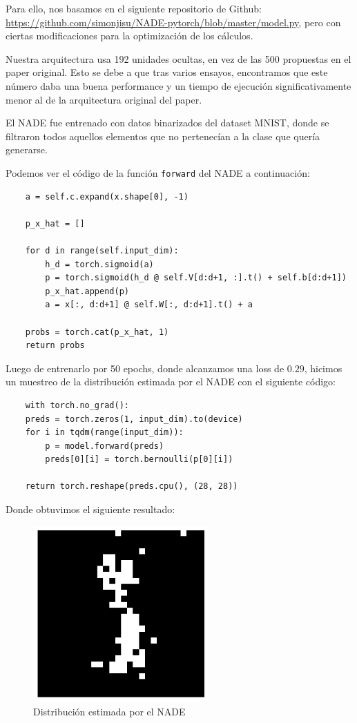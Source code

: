 \documentclass[11pt]{article}
\begin{document}
Para ello, nos basamos en el siguiente repositorio de Github: \url{https://github.com/simonjisu/NADE-pytorch/blob/master/model.py}, pero con ciertas modificaciones para la optimización de los cálculos.

Nuestra arquitectura usa 192 unidades ocultas, en vez de las 500 propuestas en el paper original. Esto se debe a que tras varios ensayos, encontramos que este número daba una buena performance y un tiempo de ejecución significativamente menor al de la arquitectura original del paper. 

El NADE fue entrenado con datos binarizados del dataset MNIST, donde se filtraron todos aquellos elementos que no pertenecían a la clase que quería generarse.

Podemos ver el código de la función \texttt{forward} del NADE a continuación:

\begin{verbatim}
    a = self.c.expand(x.shape[0], -1)

    p_x_hat = []

    for d in range(self.input_dim):
        h_d = torch.sigmoid(a)
        p = torch.sigmoid(h_d @ self.V[d:d+1, :].t() + self.b[d:d+1])
        p_x_hat.append(p)
        a = x[:, d:d+1] @ self.W[:, d:d+1].t() + a

    probs = torch.cat(p_x_hat, 1)
    return probs
\end{verbatim}

Luego de entrenarlo por 50 epochs, donde alcanzamos una loss de $0.29$, hicimos un muestreo de la distribución estimada por el NADE con el siguiente código:
\begin{verbatim}
    with torch.no_grad():
    preds = torch.zeros(1, input_dim).to(device)
    for i in tqdm(range(input_dim)):
        p = model.forward(preds)
        preds[0][i] = torch.bernoulli(p[0][i])

    return torch.reshape(preds.cpu(), (28, 28))
\end{verbatim}
Donde obtuvimos el siguiente resultado:

\begin{figure}[h]
    \centering
    \includegraphics[width=0.6\textwidth]{NADE/nade_generation.png}
    \caption{Distribución estimada por el NADE}
    \label{fig:nade_gen}
\end{figure}
\end{document}
